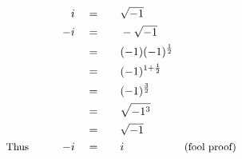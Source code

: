 \begin{alignat*}{5}
&\,&i\quad&=\quad&&\sqrt{-1}\\
&\,&-i\quad&=&&-\sqrt{-1}\\
&\,&\,&=&&(-1)(-1)^\frac{1}{2}\\
&\,&\,&=&&(-1)^{1+\frac{1}{2}}\\
&\,&\,&=&&(-1)^\frac{3}{2}\\
&\,&\,&=&&\sqrt{-1^3}\\
&\,&\,&=&&\sqrt{-1}\\
&\small\text{Thus}\normalsize\qquad&-i\quad&=&&i&\small\text{(fool proof)}
\end{alignat*}
